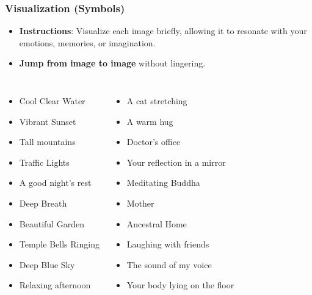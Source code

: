\begin{frame}[fragile]\frametitle{Visualization (Symbols)}
    \begin{itemize}
        \item \textbf{Instructions}: Visualize each image briefly, allowing it to resonate with your emotions, memories, or imagination.
        \item \textbf{Jump from image to image} without lingering.
    \end{itemize}
    \vspace{0.5cm}
    \begin{columns}
            \begin{itemize}
                \item Cool Clear Water
                \item Vibrant Sunset
                \item Tall mountains
                \item Traffic Lights
                \item A good night’s rest
                \item Deep Breath
                \item Beautiful Garden
                \item Temple Bells Ringing
                \item Deep Blue Sky
                \item Relaxing afternoon
            \end{itemize}
            \begin{itemize}
                \item A cat stretching
                \item A warm hug
                \item Doctor's office
                \item Your reflection in a mirror
                \item Meditating Buddha
                \item Mother
                \item Ancestral Home
                \item Laughing with friends
                \item The sound of my voice
                \item Your body lying on the floor
            \end{itemize}
    \end{columns}
\end{frame}

